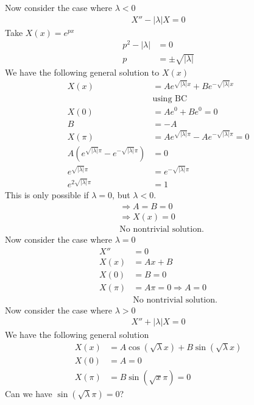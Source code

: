 \documentclass[12pt, letterpaper]{article}
\begin{document}
Now consider the case where $\lambda < 0$
\begin{align*}
    X'' - |\lambda| X = 0
\end{align*}
Take $X(x) = e^{px}$
\begin{align*}
    p^2 - |\lambda| &= 0 \\
    p &= \pm \sqrt{|\lambda|}
\end{align*}
We have the following general solution to $X(x)$
\begin{align*}
    X(x) &= Ae^{\sqrt{|\lambda|}x} + Be^{-\sqrt{|\lambda|}x} \\
    &\text{using BC} \\
    X(0) &= Ae^0 + Be^0 = 0 \\
    B &= -A \\
    X(\pi) &= Ae^{\sqrt{|\lambda|}\pi} - Ae^{-\sqrt{|\lambda|}\pi} = 0 \\
    A\left(e^{\sqrt{|\lambda|}\pi} - e^{-\sqrt{|\lambda|}\pi}\right) &= 0 \\
    e^{\sqrt{|\lambda|}\pi} &= e^{-\sqrt{|\lambda|}\pi} \\
    e^{2\sqrt{|\lambda|}\pi} &= 1
\end{align*}
This is only possible if $\lambda = 0$, but $\lambda < 0$.
\begin{align*}
    &\Rightarrow A = B = 0 \\
    &\Rightarrow X(x) = 0 \\
    &\text{No nontrivial solution.}
\end{align*}
Now consider the case where $\lambda = 0$
\begin{align*}
    X'' &= 0 \\
    X(x) &= Ax + B \\
    X(0) &= B = 0 \\
    X(\pi) &= A\pi = 0 \Rightarrow A=0 \\
    &\text{No nontrivial solution.} 
\end{align*}
Now consider the case where $\lambda > 0$
\begin{align*}
    X'' + |\lambda|X = 0
\end{align*}
We have the following general solution
\begin{align*}
    X(x) &= A\cos(\sqrt{\lambda}x) + B\sin(\sqrt{\lambda}x) \\
    X(0) &= A = 0 \\
    X(\pi) &= B\sin(\sqrt{x} \pi) = 0
\end{align*}
Can we have $\sin(\sqrt \lambda \pi) = 0$? \\
\end{document}
